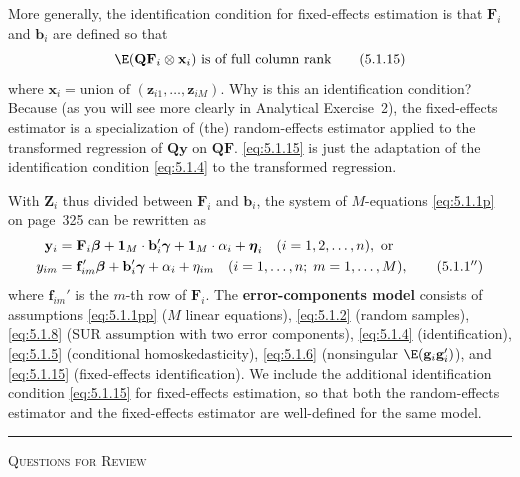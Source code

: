 More generally, the identification condition for fixed-effects estimation is that
$\mathbf{F}_i$ and $\mathbf{b}_i$ are defined so that
\begin{equation}
  \E(\mathbf{Q}\mathbf{F}_i \otimes \mathbf{x}_i) \text{ is of full column rank}
  \label{eq:5.1.15} \tag{5.1.15}
\end{equation}
where $\mathbf{x}_i = \text{union of } (\mathbf{z}_{i1}, \ldots, \mathbf{z}_{iM})$.
Why is this an identification condition?
Because (as you will see more clearly in Analytical Exercise~2), the fixed-effects
estimator is a specialization of (the) random-effects estimator applied to the transformed
regression of $\mathbf{Q}\mathbf{y}$ on $\mathbf{Q}\mathbf{F}$. \eqref{eq:5.1.15} is just the adaptation of the identification
condition \eqref{eq:5.1.4} to the transformed regression.

With $\mathbf{Z}_i$ thus divided between $\mathbf{F}_i$ and $\mathbf{b}_i$, the system of $M$-equations \eqref{eq:5.1.1p} on
page~325 can be rewritten as
\begin{align}
  \mathbf{y}_i &= \mathbf{F}_i \boldsymbol{\beta} + \mathbf{1}_M \cdot \mathbf{b}_i' \boldsymbol{\gamma}
  + \mathbf{1}_M \cdot \alpha_i + \boldsymbol{\eta}_i
  \quad (i = 1, 2, \ldots, n), \text{ or} \notag \\
  y_{im} &= \mathbf{f}_{im}' \boldsymbol{\beta} + \mathbf{b}_i' \boldsymbol{\gamma}
  + \alpha_i + \eta_{im}
  \quad (i = 1, \ldots, n;\; m = 1, \ldots, M),
  \label{eq:5.1.1pp} \tag{5.1.1$''$}
\end{align}
where $\mathbf{f}_{im}'$ is the $m$-th row of $\mathbf{F}_i$. The \textbf{error-components model} consists of assumptions
\eqref{eq:5.1.1pp} ($M$ linear equations), \eqref{eq:5.1.2} (random samples), \eqref{eq:5.1.8} (SUR
assumption with two error components), \eqref{eq:5.1.4} (identification), \eqref{eq:5.1.5} (conditional
homoskedasticity), \eqref{eq:5.1.6} (nonsingular $\E(\mathbf{g}_i\mathbf{g}_i')$), and \eqref{eq:5.1.15} (fixed-effects
identification). We include the additional identification condition \eqref{eq:5.1.15} for fixed-effects
estimation, so that both the random-effects estimator and the fixed-effects
estimator are well-defined for the same model.

\bigskip
\noindent\rule{\textwidth}{0.5pt}
\textsc{Questions for Review}
\medskip


